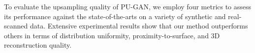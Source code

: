 
To evaluate the upsampling quality of PU-GAN, we employ four metrics to assess its performance against the state-of-the-arts on a variety of synthetic and real-scanned data.
Extensive experimental results show that our method outperforms others in terms of distribution uniformity, proximity-to-surface, and 3D reconstruction quality.



